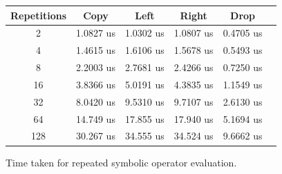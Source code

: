\begin{figure}[H]
    \begin{center}
    \begin{tabular}{ |c|c|c|c|c|c| } 
    \hline
    Repetitions	& Copy & Left & Right & Drop \\
    \hline
    2 & 1.0827 us & 1.0302 us & 1.0807 us & 0.4705 us \\
    \hline
    4 & 1.4615 us & 1.6106 us & 1.5678 us & 0.5493 us \\
    \hline
    8 & 2.2003 us & 2.7681 us & 2.4266 us & 0.7250 us \\
    \hline
    16 & 3.8366 us & 5.0191 us & 4.3835 us & 1.1549 us \\
    \hline
    32 & 8.0420 us & 9.5310 us & 9.7107 us & 2.6130 us \\
    \hline
    64 & 14.749 us & 17.855 us & 17.940 us & 5.1694 us \\
    \hline
    128 & 30.267 us & 34.555 us & 34.524 us & 9.6662 us \\
    \hline
    \end{tabular}
    \end{center}
    \caption{Time taken for repeated symbolic operator evaluation.}
    \label{fig:repeated_operator_results}
\end{figure}
